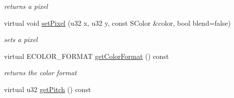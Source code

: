 \begin{DoxyCompactItemize}
\begin{DoxyCompactList}\small\item\em returns a pixel \end{DoxyCompactList}\item 
\hypertarget{classirr_1_1video_1_1_c_image_a4649b7ed2d8c323c303b8603218bf669}{virtual void \hyperlink{classirr_1_1video_1_1_c_image_a4649b7ed2d8c323c303b8603218bf669}{set\-Pixel} (u32 x, u32 y, const S\-Color \&color, bool blend=false)}\label{classirr_1_1video_1_1_c_image_a4649b7ed2d8c323c303b8603218bf669}

\begin{DoxyCompactList}\small\item\em sets a pixel \end{DoxyCompactList}\item 
\hypertarget{classirr_1_1video_1_1_c_image_a224cea58cc5b0e663ff2ed0e19441e21}{virtual E\-C\-O\-L\-O\-R\-\_\-\-F\-O\-R\-M\-A\-T \hyperlink{classirr_1_1video_1_1_c_image_a224cea58cc5b0e663ff2ed0e19441e21}{get\-Color\-Format} () const }\label{classirr_1_1video_1_1_c_image_a224cea58cc5b0e663ff2ed0e19441e21}

\begin{DoxyCompactList}\small\item\em returns the color format \end{DoxyCompactList}\item 
\hypertarget{classirr_1_1video_1_1_c_image_a45f4c9e025ad3bcd4ff4b4d0617ee501}{virtual u32 \hyperlink{classirr_1_1video_1_1_c_image_a45f4c9e025ad3bcd4ff4b4d0617ee501}{get\-Pitch} () const }\label{classirr_1_1video_1_1_c_image_a45f4c9e025ad3bcd4ff4b4d0617ee501}


\end{DoxyCompactItemize}
